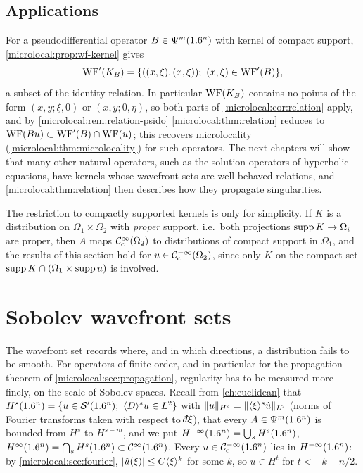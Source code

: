\subsection{Applications}
For a pseudodifferential operator $B\in\Psi^{m}(1.6^n)$ with kernel of compact
support, \cref{microlocal:prop:wf-kernel} gives
\begin{equation*}
  \WFp(K_B)=\{((x,\xi),(x,\xi));\ (x,\xi)\in\WFp(B)\},
\end{equation*}
a subset of the identity relation. In particular $\operatorname{WF}(K_B)$ contains no
points of the form $(x,y;\xi,0)$ or $(x,y;0,\eta)$, so both parts of
\cref{microlocal:cor:relation} apply, and by
\cref{microlocal:rem:relation-psido} \cref{microlocal:thm:relation} reduces to
$\operatorname{WF}(Bu)\subset\operatorname{WF}'(B)\cap\operatorname{WF}(u)$; this recovers microlocality
(\cref{microlocal:thm:microlocality}) for such operators. The next
chapters will show that many other natural operators, such as the
solution operators of hyperbolic equations, have kernels whose wavefront
sets are well-behaved relations, and \cref{microlocal:thm:relation} then
describes how they propagate singularities.

\begin{remark}\label{microlocal:rem:relation-proper}
  The restriction to compactly supported kernels is only for simplicity. If
  $K$ is a distribution on $\Omega_1\times\Omega_2$ with \emph{proper}
  support, i.e.\ both projections $\operatorname{supp} K\to\Omega_i$ are proper, then $A$
  maps $\mathcal{C}^\infty_{\mathrm{c}}(\Omega_2)$ to distributions of compact support in $\Omega_1$, and
  the results of this section hold for $u\in\mathcal{C}^{-\infty}_{\mathrm{c}}(\Omega_2)$, since only
  $K$ on the compact set $\operatorname{supp} K\cap(\Omega_1\times\operatorname{supp} u)$ is involved.
\end{remark}

\section{Sobolev wavefront sets}\label{microlocal:sec:wf-sobolev}

The wavefront set records where, and in which directions, a distribution
fails to be smooth. For operators of finite order, and in particular for the
propagation theorem of \cref{microlocal:sec:propagation}, regularity has to
be measured more finely, on the scale of Sobolev spaces. Recall from
\cref{ch:euclidean} that $H^s(1.6^n)=\{u\in\mathcal{S}'(1.6^n);\ \langle D\rangle^su\in L^2\}$ with
$\lVert u\rVert_{H^s}=\lVert \langle \xi\rangle^s\hat u\rVert_{L^2}$ (norms of Fourier transforms
taken with respect to $\dbar\xi$), that every $A\in\Psi^{m}(1.6^n)$ is bounded
from $H^s$ to $H^{s-m}$, and we put $H^{-\infty}(1.6^n)=\bigcup_sH^s(1.6^n)$,
$H^\infty(1.6^n)=\bigcap_sH^s(1.6^n)\subset\mathcal{C}^\infty(1.6^n)$. Every $u\in\mathcal{C}^{-\infty}_{\mathrm{c}}(1.6^n)$
lies in $H^{-\infty}(1.6^n)$: by \cref{microlocal:sec:fourier},
$\lvert \hat u(\xi)\rvert\le C\langle \xi\rangle^k$ for some $k$, so $u\in H^t$ for $t<-k-n/2$.

